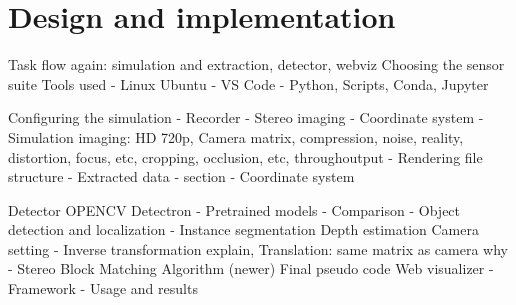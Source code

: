 \chapter{Design and implementation}
\label{chap:designimplementation}

Task flow again: simulation and extraction, detector, webviz
Choosing the sensor suite
Tools used
- Linux Ubuntu
- VS Code
- Python, Scripts, Conda, Jupyter

Configuring the simulation
- Recorder
- Stereo imaging
- Coordinate system
- Simulation imaging: HD 720p, Camera matrix, compression, noise, reality,
distortion, focus, etc, cropping, occlusion, etc, throughoutput
- Rendering file structure 
- Extracted data - section
- Coordinate system

Detector
    OPENCV
    Detectron
        - Pretrained models
            - Comparison
        - Object detection and localization
        - Instance segmentation
    Depth estimation
        Camera setting
        - Inverse transformation explain, Translation: same matrix as camera why
        - Stereo Block Matching Algorithm (newer)
    Final pseudo code
Web visualizer
-  Framework
-  Usage and results